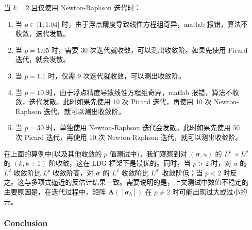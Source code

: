 当 \(k = 2\) 且仅使用 Newton-Raphson 迭代时：
\begin{enumerate}
	\item 当 \(p \in (1, 1.04]\) 时，由于浮点精度导致线性方程组奇异，matlab 报错，算法不收敛，迭代发散。
	\item 当 \(p = 1.05\) 时，需要 30 次迭代就收敛，可以测出收敛阶。如果先使用 Picard 迭代，就会发散。
	\item 当 \(p = 1.1\) 时，仅需 9 次迭代就收敛，可以测出收敛阶。
	\item 当 \(p = 10\) 时，由于浮点精度导致线性方程组奇异，matlab 报错，算法不收敛，迭代发散。此时如果先使用 10 次 Picard 迭代，再使用 10 次 Newton-Raphson 迭代，就可以测出收敛阶。
	\item 当 \(p = 30\) 时，单独使用 Newton-Raphson 迭代会发散。此时如果先使用 50 次 Picard 迭代，再使用 10 次 Newton-Raphson 迭代，就可以测出收敛阶。
\end{enumerate}

在上面的算例中(以及其他收敛的 \(p\) 值测试中)，我们观察到对 \(\left(\bm\sigma, u\right)\) 的 \(L^{p'}\times L^{p}\) 的 \(\left(k, k+1\right)\) 阶收敛，这在 LDG 框架下是最优的。同时，当 \(p > 2\) 时，对 \(u\) 的 \(L^2\) 收敛阶比 \(L^{p}\) 收敛阶高，对 \(\bm\sigma\) 的 \(L^2\) 收敛阶比 \(L^{p'}\) 收敛阶低；当 \(p < 2\) 时反之。这与多项式逼近的反估计结果一致。需要说明的是，上文测试中数值不稳定的主要原因是，在迭代过程中，矩阵 \(\bm A([\bm\sigma_{h}])\) 在 \(p \neq 2\) 时可能出现过大或过小的元。


\subsubsection{Conclusion}

